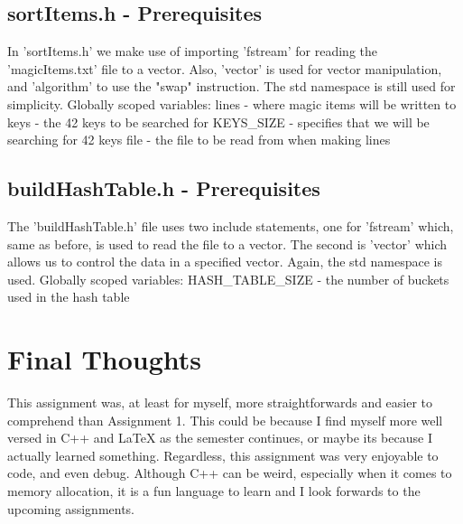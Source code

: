 \documentclass[12pt, letterpaper]{article}
\begin{document}
\subsection{sortItems.h - Prerequisites} \label{SrtItmGV}

In 'sortItems.h' we make use of importing 'fstream' for reading the 'magicItems.txt' file to a vector.
Also, 'vector' is used for vector manipulation, and 'algorithm' to use the "swap" instruction.
The std namespace is still used for simplicity.
\newline
\newline
Globally scoped variables:
\newline
\indent lines - where magic items will be written to
\newline
\indent keys - the 42 keys to be searched for
\newline
\indent KEYS\_SIZE - specifies that we will be searching for 42 keys
\newline
\indent file - the file to be read from when making lines
\newpage

\subsection{buildHashTable.h - Prerequisites} \label{BldHshTblGV}

The 'buildHashTable.h' file uses two include statements, one for 'fstream' which, same as before, is used to read the file to a vector.
The second is 'vector' which allows us to control the data in a specified vector.
Again, the std namespace is used.
\newline
\newline
Globally scoped variables:
\newline
\indent HASH\_TABLE\_SIZE - the number of buckets used in the hash table

\section{Final Thoughts}
This assignment was, at least for myself, more straightforwards and easier to comprehend than Assignment 1.
This could be because I find myself more well versed in C++ and LaTeX as the semester continues, or maybe its because I actually learned something.
Regardless, this assignment was very enjoyable to code, and even debug. 
Although C++ can be weird, especially when it comes to memory allocation, it is a fun language to learn and I look forwards to the upcoming assignments.
\end{document}
